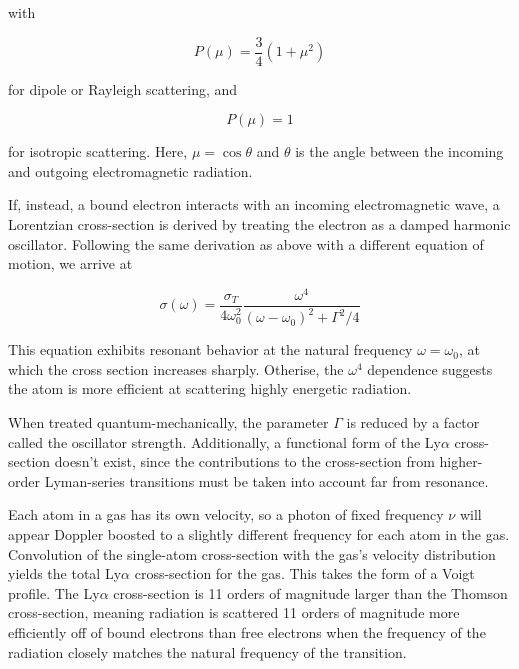 \documentclass[onecolumn]{aastex63}
\begin{document}
 \noindent with
 
\begin{equation}
    P(\mu) = \frac{3}{4}(1 + \mu^2)
\end{equation}

\noindent for dipole or Rayleigh scattering, and 

\begin{equation}
    P(\mu) = 1
\end{equation}

for isotropic scattering. Here, $\mu = \cos{\theta}$ and $\theta$ is the angle between the incoming and outgoing electromagnetic radiation.

If, instead, a bound electron interacts with an incoming electromagnetic wave, a Lorentzian cross-section is derived by treating the electron as a damped harmonic oscillator. Following the same derivation as above with a different equation of motion, we arrive at 

\begin{equation}
    \sigma(\omega) = \frac{\sigma_T}{4\omega_0^2} \frac{\omega^4}{(\omega-\omega_0)^2 + \Gamma^2/4}
\end{equation}

This equation exhibits resonant behavior at the natural frequency $\omega = \omega_0$, at which the cross section increases sharply. Otherise, the $\omega^4$ dependence suggests the atom is more efficient at scattering highly energetic radiation.

When treated quantum-mechanically, the parameter $\Gamma$ is reduced by a factor called the oscillator strength. Additionally, a functional form of the Ly$\alpha$ cross-section doesn't exist, since the contributions to the cross-section from higher-order Lyman-series transitions must be taken into account far from resonance.

Each atom in a gas has its own velocity, so a photon of fixed frequency $\nu$ will appear Doppler boosted to a slightly different frequency for each atom in the gas. Convolution of the single-atom cross-section with the gas's velocity distribution yields the total Ly$\alpha$ cross-section for the gas. This takes the form of a Voigt profile. The Ly$\alpha$ cross-section is 11 orders of magnitude larger than the Thomson cross-section, meaning radiation is scattered 11 orders of magnitude more efficiently off of bound electrons than free electrons when the frequency of the radiation closely matches the natural frequency of the transition.

\end{document}
